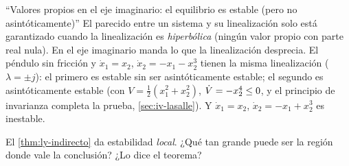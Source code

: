 
\begin{trampa}[label=tr:ly-imaginario]{``Valores propios en el eje imaginario: el equilibrio es estable (pero no asintóticamente)''}
El parecido entre un sistema y su linealización solo está garantizado cuando la linealización es \emph{hiperbólica} (ningún valor propio con parte real nula). En el eje imaginario manda lo que la linealización desprecia. El péndulo sin fricción y $\dot x_1=x_2$, $\dot x_2=-x_1-x_2^3$ tienen la misma linealización ($\lambda=\pm j$): el primero es estable sin ser asintóticamente estable; el segundo es asintóticamente estable (con $V=\tfrac12(x_1^2+x_2^2)$, $\dot V=-x_2^4\le0$, y el principio de invarianza completa la prueba, \cref{sec:iv-lasalle}). Y $\dot x_1=x_2$, $\dot x_2=-x_1+x_2^3$ es inestable.
\end{trampa}

\begin{pausa}
El \cref{thm:ly-indirecto} da estabilidad \emph{local}. ¿Qué tan grande puede ser la región donde vale la conclusión? ¿Lo dice el teorema?
\end{pausa}
